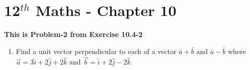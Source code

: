 \documentclass[journal,10pt,twocolumn]{article}
\begin{document}
\begin{center}
\title{\textbf{}}
\date{\vspace{-5ex}} %
\maketitle
\end{center}
\setcounter{page}{1}
\section{12$^{th}$ Maths - Chapter 10}
\textbf{This is Problem-2 from Exercise 10.4-2}
\begin{enumerate}

\item Find a unit vector  perpendicular to each of a vector $\bar{a}+\bar{b} \text{ and }\bar{a}-\bar{b}$ where  $\overrightarrow{a}=3\hat{i}+2\hat{j}+2\hat{k}\text{ and }\overrightarrow{b}=\hat{i}+2\hat{j}-2\hat{k}$

\end{enumerate}
\end{document}

